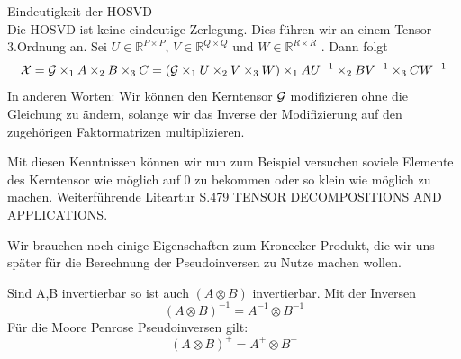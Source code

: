 \begin{Bemerkung} Eindeutigkeit der HOSVD \\
Die HOSVD ist keine eindeutige Zerlegung. Dies führen wir an einem Tensor 3.Ordnung an. Sei $U \in \mathbb{R}^{P \times P}$, $V \in \mathbb{R}^{Q \times Q}$  und $W \in \mathbb{R}^{R \times R}$ . Dann folgt
\begin{equation}
{\cal X} = {\cal G} \times_1 A \times_2 B \times_3 C = ({\cal G} \times_1 U \times_2 V \times_3 W) \times_1 AU^{-1} \times_2 BV^{-1} \times_3 CW^{-1}
\end{equation}
In anderen Worten: Wir können den Kerntensor ${\cal G}$ modifizieren ohne die Gleichung zu ändern, solange wir das Inverse der Modifizierung auf den zugehörigen Faktormatrizen multiplizieren.
\end{Bemerkung}

Mit diesen Kenntnissen können wir nun zum Beispiel versuchen soviele Elemente des Kerntensor wie möglich auf 0 zu bekommen oder so klein wie möglich zu machen.
Weiterführende Liteartur S.479 TENSOR DECOMPOSITIONS AND APPLICATIONS.

Wir brauchen noch einige Eigenschaften zum Kronecker Produkt, die wir uns später für die Berechnung der Pseudoinversen zu Nutze machen wollen.

\begin{Lemma}
Sind A,B invertierbar so ist auch $(A \otimes B)$ invertierbar. Mit der Inversen
\begin{equation*}
(A \otimes B)^{-1} = A^{-1} \otimes B^{-1}
\end{equation*}
Für die Moore Penrose Pseudoinversen gilt:
\begin{equation*}
(A \otimes B)^{+} = A^{+} \otimes B^{+}
\end{equation*}
\end{Lemma}

